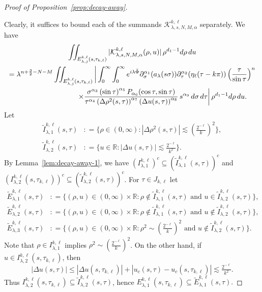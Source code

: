 \documentclass[leqno]{amsart}
\theoremstyle{definition}
\theoremstyle{remark}
\numberwithin{equation}{section}
\newcommand{\R}{\mathbb{R}}
\begin{document}
\begin{proof}[Proof of Proposition~\ref{prop:decay-away}]
\begin{itemize}
\end{itemize}
Clearly, it suffices to bound each of the summands $\mathcal K_{\lambda,s,N,M,\alpha}^{k,\ell}$ separately. We have
\begin{multline}
 \iint_{E_{\lambda,j}^{k,\ell}(s,\tau_{k,\ell})} | \mathcal K_{\lambda,s,N,M,\alpha}^{k,\ell}(\rho,u)| \, \rho^{d_1-1} d\rho \, du\\
 = \lambda^{n + \frac{3}{2}-N-M} \iint_{E_{\lambda,j}^{k,\ell}(s,\tau_{k,\ell})}\bigg| \int_0^\infty \int_0^\infty  e^{i \lambda \tilde \Phi} \partial_\sigma^{\alpha_1} (a_{\lambda}(s \sigma)) \partial_\tau^{\alpha_2}(\eta_\ell(\tau-k \pi))\left(\frac{\tau}{\sin \tau}\right)^{n}  \\
  \hskip3cm\times \frac{\sigma^{\alpha_3} \left(\sin \tau\right)^{\alpha_5} P_{\alpha_6}(\cos\tau,\sin\tau)}{\tau^{\alpha_ 4 } \left( \Delta \rho^2(s,\tau) \right)^{\alpha_7}\left( \Delta u (s,\tau) \right)^{\alpha_8} } \, s^{\alpha_9} \, d\sigma \, d \tau \bigg| \, \rho^{d_1-1} d\rho \, du.\label{KNM}
\end{multline}
Let
\begin{align*}
\tilde I_{\lambda,1}^{k,\ell}(s,\tau) &: = \{ \rho\in (0,\infty):
\left|\Delta \rho^2(s,\tau)\right| \lesssim (\tfrac{2^{-\ell}}{k})^2 
\} , \\
\tilde I_{\lambda,2}^{k,\ell}(s,\tau) &: = 
\{ u \in \R:
\left|\Delta u (s,\tau)\right| \lesssim \tfrac{2^{-\ell}}{k^2}\}.
\end{align*}
By Lemma~\ref{lem:decay-away-1}, we have $(I_{\lambda,1}^{k,\ell})^c\subseteq (\tilde I_{\lambda,1}^{k,\ell}(s,\tau))^c$ and $(I_{\lambda,2}^{k,\ell}(s,\tau_{k,\ell}))^c\subseteq (\tilde I_{\lambda,2}^{k,\ell}(s,\tau))^c$.   For $\tau\in J_{k,\ell}$ let 
\begin{align*}
\tilde E_{\lambda,1}^{k,\ell}(s,\tau)
&: = \{(\rho,u)\in(0,\infty) \times \R :\rho\notin \tilde I_{\lambda,1}^{k,\ell}(s,\tau) \text{ and } u \in \tilde I_{\lambda,2}^{k,\ell}(s,\tau) \},\\
\tilde E_{\lambda,2}^{k,\ell}(s,\tau)
&: = \{(\rho,u)\in(0,\infty) \times \R :\rho\notin \tilde I_{\lambda,1}^{k,\ell}(s,\tau) \text{ and } u \notin \tilde I_{\lambda,2}^{k,\ell}(s,\tau) \},\\
\tilde E_{\lambda,3}^{k,\ell}(s,\tau)
&: = \{(\rho,u)\in (0,\infty) \times \R : \rho^2\sim (\tfrac{2^{-\ell}}{k})^2 \text{ and } u \notin \tilde I_{\lambda,2}^{k,\ell}(s,\tau)\}.
\end{align*}
Note that $\rho\in I_{\lambda,1}^{k,\ell}$ implies $\rho^2\sim (\tfrac{2^{-\ell}}{k})^2 $. On the other hand, if $ u \in I_{\lambda,2}^{k,\ell}(s,\tau_{k,\ell})$, then
\[
|\Delta u (s,\tau)| \le |\Delta u (s,\tau_{k,\ell} )| + | u _c(s,\tau)- u _c(s,\tau_{k,\ell} )| \lesssim \tfrac{2^{-\ell}}{k^2}.
\]
Thus $I_{\lambda,2}^{k,\ell}(s,\tau_{k,\ell})\subseteq \tilde I_{\lambda,2}^{k,\ell}(s,\tau)$, hence  
$E_{\lambda,1}^{k,\ell}(s,\tau_{k,\ell}) \subseteq \tilde E_{\lambda,1}^{k,\ell}(s,\tau).$
 

\end{proof}
\end{document}
